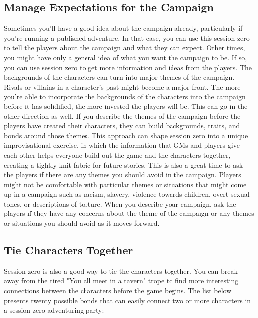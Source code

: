 \documentclass[10pt,a4paper,twoside,bg=print,twocolumn,openany,nodeprecatedcode]{dndbook}
\begin{document}
\subsection{Manage Expectations for the Campaign}
Sometimes you'll have a good idea about the campaign already, particularly if you're running a published adventure. In that case, you can use this session zero to tell the players about the campaign and what they can expect.
Other times, you might have only a general idea of what you want the campaign to be. If so, you can use session zero to get more information and ideas from the players. The backgrounds of the characters can turn into major themes of the campaign. Rivals or villains in a character's past might become a major front. The more you're able to incorporate the backgrounds of the characters into the campaign before it has solidified, the more invested the players will be.
This can go in the other direction as well. If you describe the themes of the campaign before the players have created their characters, they can build backgrounds, traits, and bonds around those themes. This approach can shape session zero into a unique improvisational exercise, in which the information that GMs and players give each other helps everyone build out the game and the characters together, creating a tightly knit fabric for future stories.
This is also a great time to ask the players if there are any themes you should avoid in the campaign. Players might not be comfortable with particular themes or situations that might come up in a campaign such as racism, slavery, violence towards children, overt sexual tones, or descriptions of torture. When you describe your campaign, ask the players if they have any concerns about the theme of the campaign or any themes or situations you should avoid as it moves forward.
\subsection{Tie Characters Together}
Session zero is also a good way to tie the characters together. You can break away from the tired "You all meet in a tavern" trope to find more interesting connections between the characters before the game begins.
The list below presents twenty possible bonds that can easily connect two or more characters in a session zero adventuring party:
\end{document}

